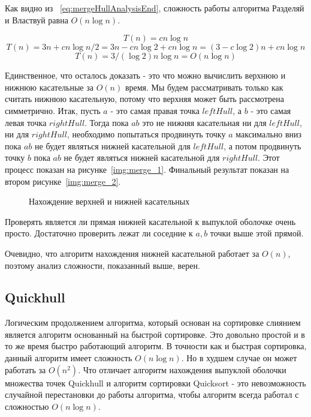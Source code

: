 Как видно из ~\ref{eq:mergeHullAnalysisEnd}, сложность работы алгоритма Разделяй и Властвуй равна $O(n \log n)$.

\[
T(n) = cn \log n
\]
\[
T(n) = 3n + cn \log n/2 = 3n - cn \log 2 + cn \log n = (3 - c \log 2)n + cn \log n
\]
\begin{equation}\label{eq:mergeHullAnalysisEnd}
T(n) = 3/(\log 2)n \log n = O(n \log n)
\end{equation}

Единственное, что осталось доказать - это что можно вычислить верхнюю и нижнюю касательные за $O(n)$ время. Мы будем рассматривать только как считать нижнюю касательную, потому что верхняя может быть рассмотрена симметрично. Итак, пусть $a$ - это самая правая точка $leftHull$, а $b$ - это самая левая точка $rightHull$. Тогда пока $ab$ это не нижняя касательная ни для $leftHull$, ни для $rightHull$, необходимо попытаться продвинуть точку $a$ максимально вниз пока $ab$ не будет являться нижней касательной для $leftHull$, а потом продвинуть точку $b$ пока $ab$ не будет являться нижней касательной для $rightHull$. Этот процесс показан на рисунке~\ref{img:merge_1}. Финальный результат показан на втором рисунке~\ref{img:merge_2}.

\begin{figure}[H]
	{\centering
		\hfill
		\subbottom[\label{img:merge_1}]{%
			}
		\hfill
		\subbottom[\label{img:merge_2}]{%
			}
		\hfill
	}
	\caption{Нахождение верхней и нижней касательных}
	\label{img:merge}
\end{figure}


Проверять является ли прямая нижней касательной к выпуклой оболочке очень просто. Достаточно проверить лежат ли соседние к $a, b$ точки выше этой прямой.

Очевидно, что алгоритм нахождения нижней касательной работает за $O(n)$, поэтому анализ сложности, показанный выше, верен.

\subsection{Quickhull} \label{subsect1_1_4}

Логическим продолжением алгоритма, который основан на сортировке слиянием является алгоритм основанный на быстрой сортировке. Это довольно простой и в то же время быстро работающий алгоритм. В точности как и быстрая сортировка, данный алгоритм имеет сложность $O(n \log n)$. Но в худшем случае он может работать за $O(n^2)$. Что отличает алгоритм нахождения выпуклой оболочки множества точек Quickhull и алгоритм сортировки Quicksort - это невозможность случайной перестановки до работы алгоритма, чтобы алгоритм всегда работал с сложностью $O(n \log n)$.

